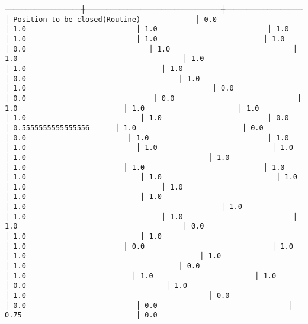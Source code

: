 \documentclass[11pt]{article}
\begin{document}
\begin{Verbatim}[commandchars=\\\{\}]
──────────────────┼────────────────────────────────┼───────────────────────────────────────┼────────────────────────────────────────────────────────────┼───────────────────────────────────────────┼──────────────────────────────────────┼────────────────────────────────────┼─────────────────────────────────────────────────────┼───────────────────────────────────────────┼───────────────────────────────────────────┼────────────────────────────────────┼────────────────────────┼───────────────────────────────────────┼──────────────────────────────────────┼────────────────────────────────────┼────────────────────────────────────────┼────────────────────────────────┼──────────────────────────┼─────────────────────────────┤
│ Position to be closed(Routine)             │ 0.0                                      │ 1.0                          │ 1.0                          │ 1.0                          │ 1.0                          │ 1.0                         │ 1.0                         │ 0.0                             │ 1.0                             │ 1.0                                       │ 1.0                                  │ 1.0                                │ 1.0                                         │ 0.0                                    │ 1.0                                    │ 1.0                                            │ 0.0                             │ 0.0                              │ 0.0                             │ 1.0                         │ 1.0                      │ 1.0                                │ 1.0                           │ 1.0                         │ 0.0                      │ 0.5555555555555556      │ 1.0                         │ 0.0                                  │ 0.0                        │ 1.0                            │ 1.0                           │ 1.0                          │ 1.0                           │ 1.0                                            │ 1.0                                           │ 1.0                      │ 1.0                       │ 1.0                            │ 1.0                                │ 1.0                           │ 1.0                           │ 1.0                          │ 1.0                                │ 1.0                            │ 1.0                           │ 1.0                                         │ 1.0                                              │ 1.0                           │ 1.0                                │ 1.0                          │ 1.0                                       │ 0.0                          │ 1.0                           │ 1.0                                     │ 1.0                       │ 0.0                              │ 1.0                                     │ 1.0                                         │ 1.0                                         │ 1.0                                    │ 0.0                                │ 1.0                         │ 1.0                        │ 1.0                              │ 0.0                                 │ 1.0                            │ 1.0                                           │ 0.0                            │ 0.0                          │ 0.0                               │ 0.75                           │ 0.0       
\end{Verbatim}
\end{document}
